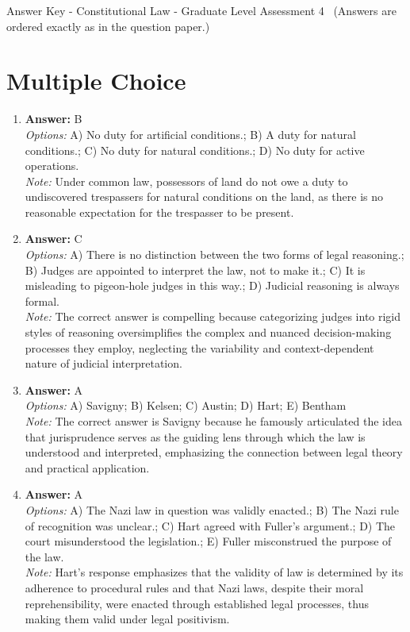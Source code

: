 \documentclass[12pt]{article}
\begin{document}
\begin{center}
Answer Key - Constitutional Law - Graduate Level Assessment 4 \
\small (Answers are ordered exactly as in the question paper.)
\end{center}

\section*{Multiple Choice}
\begin{enumerate}[label=\arabic*.]
\item \textbf{Answer:} B
\\ \textit{Options:} A) No duty for artificial conditions.; B) A duty for natural conditions.; C) No duty for natural conditions.; D) No duty for active operations.
\\ \textit{Note:} Under common law, possessors of land do not owe a duty to undiscovered trespassers for natural conditions on the land, as there is no reasonable expectation for the trespasser to be present.
\item \textbf{Answer:} C
\\ \textit{Options:} A) There is no distinction between the two forms of legal reasoning.; B) Judges are appointed to interpret the law, not to make it.; C) It is misleading to pigeon-hole judges in this way.; D) Judicial reasoning is always formal.
\\ \textit{Note:} The correct answer is compelling because categorizing judges into rigid styles of reasoning oversimplifies the complex and nuanced decision-making processes they employ, neglecting the variability and context-dependent nature of judicial interpretation.
\item \textbf{Answer:} A
\\ \textit{Options:} A) Savigny; B) Kelsen; C) Austin; D) Hart; E) Bentham
\\ \textit{Note:} The correct answer is Savigny because he famously articulated the idea that jurisprudence serves as the guiding lens through which the law is understood and interpreted, emphasizing the connection between legal theory and practical application.
\item \textbf{Answer:} A
\\ \textit{Options:} A) The Nazi law in question was validly enacted.; B) The Nazi rule of recognition was unclear.; C) Hart agreed with Fuller's argument.; D) The court misunderstood the legislation.; E) Fuller misconstrued the purpose of the law.
\\ \textit{Note:} Hart's response emphasizes that the validity of law is determined by its adherence to procedural rules and that Nazi laws, despite their moral reprehensibility, were enacted through established legal processes, thus making them valid under legal positivism.

\end{enumerate}
\end{document}
